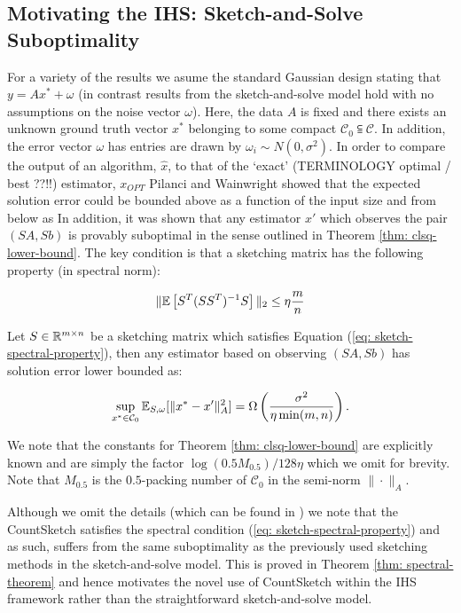 \subsection{Motivating the IHS: Sketch-and-Solve Suboptimality} \label{sec: why-ihs}

For a variety of the results we asume the standard Gaussian design
stating that $y = A x^* + \omega$ (in contrast results from the sketch-and-solve
model hold with no assumptions on the noise vector $\omega$).
Here, the data $A$ is fixed and there exists an unknown ground truth
vector $x^*$ belonging to some compact $\mathcal{C}_0 \subseteqq \mathcal{C}$.
In addition, the error vector $\omega$ has entries are drawn
by $\omega_i \sim N(0, \sigma^2)$.
In order to compare the output of an algorithm, $\hat{x}$, to that of the
\color{red} `exact' (TERMINOLOGY optimal / best ??!!) \color{black} estimator, $x_{OPT}$ Pilanci and Wainwright
showed that the expected solution error could be bounded above as a function
of the input size and from below as
In addition, it was shown that any estimator $x'$ which observes the pair
$(SA, Sb)$ is provably suboptimal in the sense outlined in Theorem
\ref{thm: clsq-lower-bound}.
The key condition is that a sketching matrix has the following
property (in spectral norm):

\begin{equation} \label{eq: sketch-spectral-property}
  \| \mathbb{E} \left[ S^T (S S^T)^{-1} S \right] \|_2 \le \eta \frac{m}{n}
\end{equation}

\begin{thm} \label{thm: clsq-lower-bound}
  Let $S \in \mathbb{R}^{m \times n}$ be a sketching matrix which satisfies
  Equation (\ref{eq: sketch-spectral-property}), then any estimator
  based on observing $(SA, Sb)$ has solution error lower bounded as:

  \begin{equation}
    \sup_{x^* \in \mathcal{C}_0} \mathbb{E}_{S,\omega} [\|x^* - x'\|_A^2 ]
     = \Omega \left(
    \frac{\sigma^2}{\eta \min(m,n)} \right).
  \end{equation}
\end{thm}

\begin{rem}
  We note that the constants for Theorem \ref{thm: clsq-lower-bound} are
  explicitly known and are simply the factor $\log(0.5 M_{0.5})/128\eta$
  which we omit for brevity.
  Note that $M_{0.5}$ is the $0.5$-packing number of $\mathcal{C}_0$ in
  the semi-norm $\| \cdot \|_A$.
\end{rem}
Although we omit the details (which can be found in \cite{pilanci2016iterative})
we note that the CountSketch satisfies the spectral condition (\ref{eq: sketch-spectral-property})
and as such, suffers from the same suboptimality as the previously used
sketching methods in the sketch-and-solve model.
This is proved in Theorem \ref{thm: spectral-theorem} and hence motivates the
novel use of CountSketch within the IHS framework rather than the straightforward
sketch-and-solve model.

